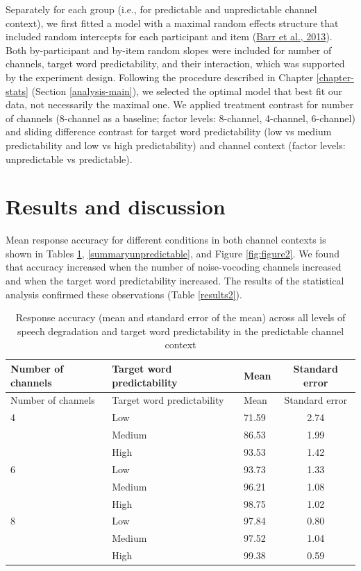 \documentclass[a4paper, nobind]{templates/ociamthesis}
\begin{document}
Separately for each group (i.e., for predictable and unpredictable channel context), we first fitted a model with a maximal random effects structure that included random intercepts for each participant and item (\protect\hyperlink{ref-Barr2013}{Barr et al., 2013}).
Both by-participant and by-item random slopes were included for number of channels, target word predictability, and their interaction,
which was supported by the experiment design.
Following the procedure described in Chapter \ref{chapter-stats} (Section \ref{analysis-main}),
we selected the optimal model that best fit our data, not necessarily the maximal one.
We applied treatment contrast for number of channels (8-channel as a baseline; factor levels: 8-channel, 4-channel, 6-channel) and sliding difference contrast for target word predictability (low vs medium predictability and low vs high predictability) and channel context (factor levels: unpredictable vs predictable).

\hypertarget{results-and-discussion-2}{%
\section{Results and discussion}\label{results-and-discussion-2}}

Mean response accuracy for different conditions in both channel contexts is shown in Tables \ref{summarypredictable}, \ref{summaryunpredictable}, and Figure \ref{fig:figure2}.
We found that accuracy increased when the number of noise-vocoding channels increased and when the target word predictability increased.
The results of the statistical analysis confirmed these observations (Table \ref{results2}).

\begin{longtable}[]{@{}lllc@{}}
\caption{Response accuracy (mean and standard error of the mean) across all levels of speech degradation and target word predictability in the predictable channel context}
\label{summarypredictable}
\tabularnewline
\toprule
Number of channels & Target word predictability & Mean & Standard
error \\
\midrule
\endfirsthead
\toprule
Number of channels & Target word predictability & Mean & Standard
error \\
\midrule
\endhead
4 & Low & 71.59 & 2.74 \\
& Medium & 86.53 & 1.99 \\
& High & 93.53 & 1.42 \\
6 & Low & 93.73 & 1.33 \\
& Medium & 96.21 & 1.08 \\
& High & 98.75 & 1.02 \\
8 & Low & 97.84 & 0.80 \\
& Medium & 97.52 & 1.04 \\
& High & 99.38 & 0.59 \\
\bottomrule
\end{longtable}
\end{document}
